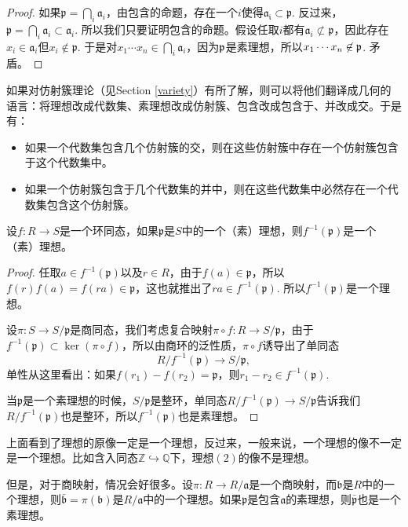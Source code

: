\begin{proof}
	如果$\mathfrak{p}=\bigcap_i \mathfrak{a}_i$，由包含的命题，存在一个$i$使得$\mathfrak{a_i}\subset \mathfrak{p}$. 反过来，$\mathfrak{p}=\bigcap_i \mathfrak{a}_i\subset \mathfrak{a}_i$. 所以我们只要证明包含的命题。假设任取$i$都有$\mathfrak{a}_i\not\subset \mathfrak{p}$，因此存在$x_i\in\mathfrak{a}_i$但$x_i\not\in \mathfrak{p}$. 于是对$x_1\cdots x_n\in \bigcap_{i} \mathfrak{a}_i$，因为$\mathfrak{p}$是素理想，所以$x_1\cdots x_n\not\in \mathfrak{p}$. 矛盾。
\end{proof}

\para 如果对仿射簇理论（见Section \ref{variety}）有所了解，则可以将他们翻译成几何的语言：将理想改成代数集、素理想改成仿射簇、包含改成包含于、并改成交。于是有：
\begin{itemize}
\item 如果一个代数集包含几个仿射簇的交，则在这些仿射簇中存在一个仿射簇包含于这个代数集中。
\item 如果一个仿射簇包含于几个代数集的并中，则在这些代数集中必然存在一个代数集包含这个仿射簇。
\end{itemize}

\para 设$f:R\to S$是一个环同态，如果$\mathfrak{p}$是$S$中的一个（素）理想，则$f^{-1}(\mathfrak{p})$是一个（素）理想。

\begin{proof}
	任取$a\in f^{-1}(\mathfrak{p})$以及$r\in R$，由于$f(a)\in \mathfrak{p}$，所以$f(r)f(a)=f(ra)\in \mathfrak{p}$，这也就推出了$ra\in f^{-1}(\mathfrak{p})$. 所以$f^{-1}(\mathfrak{p})$是一个理想。

	设$\pi:S\to S/\mathfrak{p}$是商同态，我们考虑复合映射$\pi\circ f:R\to S/\mathfrak{p}$，由于$f^{-1}(\mathfrak{p})\subset \ker(\pi\circ f)$，所以由商环的泛性质，$\pi\circ f$诱导出了单同态\[R/f^{-1}(\mathfrak{p})\to S/\mathfrak{p},\]
	单性从这里看出：如果$f(r_1)-f(r_2)=\mathfrak{p}$，则$r_1-r_2\in f^{-1}(\mathfrak{p})$. 

	当$\mathfrak{p}$是一个素理想的时候，$S/\mathfrak{p}$是整环，单同态$R/f^{-1}(\mathfrak{p})\to S/\mathfrak{p}$告诉我们$R/f^{-1}(\mathfrak{p})$也是整环，所以$f^{-1}(\mathfrak{p})$也是素理想。
\end{proof}

\para 上面看到了理想的原像一定是一个理想，反过来，一般来说，一个理想的像不一定是一个理想。比如含入同态$\mathbb{Z}\hookrightarrow \mathbb{Q}$下，理想$(2)$的像不是理想。

但是，对于商映射，情况会好很多。设$\pi:R\to R/\mathfrak{a}$是一个商映射，而$\mathfrak{b}$是$R$中的一个理想，则$\bar{\mathfrak{b}}=\pi(\mathfrak{b})$是$R/\mathfrak{a}$中的一个理想。如果$\mathfrak{p}$是包含$\mathfrak{a}$的素理想，则$\bar{\mathfrak{p}}$也是一个素理想。

